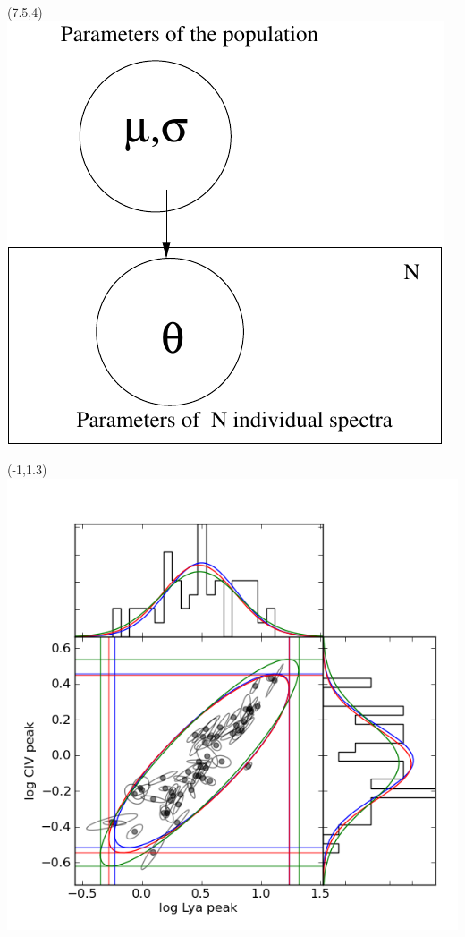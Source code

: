 \documentclass{article}
\renewcommand{\Large}       {\fontsize{20.74}{25}\selectfont}
\begin{document}
\begin{textblock}{10}(7.5,4)
\includegraphics[height=4\TPVertModule]{images/plate.pdf}\\
\end{textblock}

\begin{textblock}{10}(-1,1.3)\Large\centering
\includegraphics[height=8\TPVertModule]{images/Lya_CIV_peak_cor.png}\\
\end{textblock}
\end{document}
